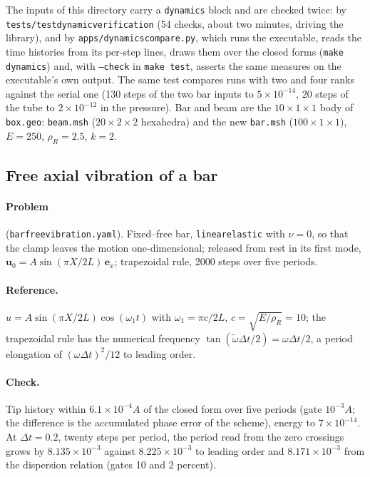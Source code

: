 \documentclass[11pt]{article}
\newcommand{\bu}{\bm{u}}
\newcommand{\be}{\bm{e}}
\DeclareRobustCommand{\code}[1]{{\def\_{\textunderscore\allowbreak}\texttt{#1}}}
\DeclareRobustCommand{\file}[1]{{\def\_{\textunderscore\allowbreak}\texttt{#1}}}
\begin{document}
The inputs of this directory carry a \code{dynamics} block and are checked
twice: by \file{tests/test\_dynamic\_verification} (54 checks, about two
minutes, driving the library), and by \file{apps/dynamics\_compare.py}, which
runs the executable, reads the time histories from its per-step lines,
draws them over the closed forms (\code{make dynamics}) and, with
\code{--check} in \code{make test}, asserts the same measures on the
executable's own output.  The same test compares runs with two and four
ranks against the serial one (130 steps of the two bar inputs to
$5\times10^{-14}$, 20 steps of the tube to $2\times10^{-12}$ in the
pressure).  Bar and beam are the $10\times1\times1$ body of
\file{box.geo}: \file{beam.msh} ($20\times2\times2$ hexahedra) and the new
\file{bar.msh} ($100\times1\times1$), $E = 250$, $\rho_R = 2.5$, $k = 2$.

\subsection{Free axial vibration of a bar}
\paragraph{Problem} (\file{bar\_free\_vibration.yaml}).  Fixed--free bar,
\code{linear\_elastic} with $\nu = 0$, so that the clamp leaves the motion
one-dimensional; released from rest in its first mode,
$\bu_0 = A\sin(\pi X/2L)\,\be_x$; trapezoidal rule, 2000 steps over five
periods.
\paragraph{Reference.}  $u = A\sin(\pi X/2L)\cos(\omega_1 t)$ with
$\omega_1 = \pi c/2L$, $c = \sqrt{E/\rho_R} = 10$; the trapezoidal rule has
the numerical frequency $\tan(\tilde\omega\Delta t/2) = \omega\Delta t/2$,
a period elongation of $(\omega\Delta t)^2/12$ to leading order.
\paragraph{Check.}  Tip history within $6.1\times10^{-4}A$ of the closed
form over five periods (gate $10^{-3}A$; the difference is the accumulated
phase error of the scheme), energy to $7\times10^{-14}$.  At $\Delta t =
0.2$, twenty steps per period, the period read from the zero crossings
grows by $8.135\times10^{-3}$ against $8.225\times10^{-3}$ to leading order
and $8.171\times10^{-3}$ from the dispersion relation (gates 10 and 2
percent).
\end{document}
